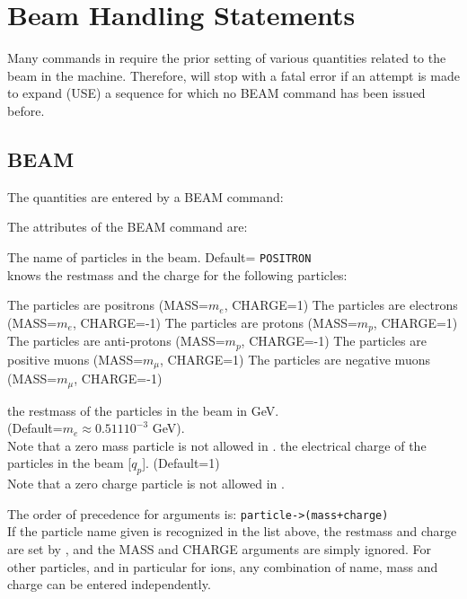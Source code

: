 \chapter{Beam Handling Statements} 
\label{chap:beam}

Many commands in \mad require the prior setting of various quantities related
to the beam in the machine. Therefore, \mad will stop with a fatal
error if an attempt is made to expand (USE) a sequence for which no BEAM
command has been issued before.  



\section{BEAM}
\label{sec:beam}

The quantities are entered by a BEAM command: 

The attributes of the BEAM command are: 
\begin{madlist}
   The name of particles in the beam. Default= {\tt POSITRON}\\
  \mad knows the restmass and the charge for the following particles:
  \begin{madlist}
     The particles are positrons (MASS=$m_e$, CHARGE=1)
     The particles are electrons (MASS=$m_e$, CHARGE=-1) 
     The particles are protons (MASS=$m_p$, CHARGE=1)
     The particles are anti-protons (MASS=$m_p$, CHARGE=-1) 
     The particles are positive muons (MASS=$m_{\mu}$, CHARGE=1) 
     The particles are negative muons (MASS=$m_{\mu}$, CHARGE=-1) 
  \end{madlist}
   the restmass of the particles in the beam in GeV. \\
  (Default=$m_e \approx 0.511 10^{-3}$ GeV).\\
  Note that a zero mass particle is not allowed in \mad.
  \label{beam_charge} the electrical charge of the
  particles in the beam [$q_p$]. (Default=1) \\
  Note that a zero charge particle is not allowed in \mad.
\end{madlist} 
The order of precedence for arguments is:  {\tt particle->(mass+charge)}\\ 
If the particle name given is recognized in the list above, the restmass
and charge are set by \mad, and the MASS and CHARGE arguments are
simply ignored. For other particles, and in particular for ions, any
combination of name, mass and charge can be entered independently.
\\

